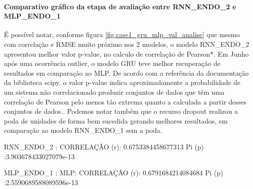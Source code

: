                 \paragraph{Comparativo gráfico da etapa de avaliação entre RNN\_ENDO\_2 e MLP\_ENDO\_1}
                
                  É possível notar, conforme figura \ref{fig:case1_gru_mlp_val_analise} que mesmo com correlação e RMSE muito próximo nos 2 modelos, o modelo RNN\_ENDO\_2 apresentou melhor valor p-value, no calculo de correlação de Pearson*. 
                  Em Junho após uma ocorrência outlier, o modelo GRU teve melhor recuperação de resultados em comparação ao MLP.
                  De acordo com a referência da documentação da biblioteca scipy, o valor p-value indica aproximadamente a probabilidade de um sistema não correlacionado produzir conjuntos de dados que têm uma correlação de Pearson pelo menos tão extrema quanto a calculada a partir desses conjuntos de dados.\newline.
                  Podemos notar também que o recurso dropout realizou a poda de unidades de forma bem sucedida gerando melhores resultados, em comparação ao modelo RNN\_ENDO\_1 sem a poda.
                    
                  RNN\_ENDO\_2 :\newline 
                  CORRELAÇÃO (r): 0.6753384458677313 \newline
                  Pi (p) :3.903678433027079e-13
                  
                  MLP\_ENDO\_1 :\newline 
                  MLP: CORRELAÇÃO (r): 0.6791684214084684 \newline
                  Pi (p) :2.5590689588089596e-13\newline
                  \begin{figure}[H]
                    \end{figure}


